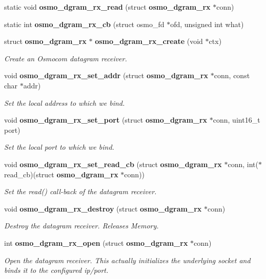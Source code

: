 \begin{DoxyCompactItemize}
static void {\bfseries osmo\+\_\+dgram\+\_\+rx\+\_\+read} (struct {\bf osmo\+\_\+dgram\+\_\+rx} $\ast$conn)
\item 
static int {\bfseries osmo\+\_\+dgram\+\_\+rx\+\_\+cb} (struct osmo\+\_\+fd $\ast$ofd, unsigned int what)
\item 
struct {\bf osmo\+\_\+dgram\+\_\+rx} $\ast$ {\bf osmo\+\_\+dgram\+\_\+rx\+\_\+create} (void $\ast$ctx)
\begin{DoxyCompactList}\small\item\em Create an Osmocom datagram receiver. \end{DoxyCompactList}\item 
void {\bf osmo\+\_\+dgram\+\_\+rx\+\_\+set\+\_\+addr} (struct {\bf osmo\+\_\+dgram\+\_\+rx} $\ast$conn, const char $\ast$addr)
\begin{DoxyCompactList}\small\item\em Set the local address to which we bind. \end{DoxyCompactList}\item 
void {\bf osmo\+\_\+dgram\+\_\+rx\+\_\+set\+\_\+port} (struct {\bf osmo\+\_\+dgram\+\_\+rx} $\ast$conn, uint16\+\_\+t port)
\begin{DoxyCompactList}\small\item\em Set the local port to which we bind. \end{DoxyCompactList}\item 
void {\bf osmo\+\_\+dgram\+\_\+rx\+\_\+set\+\_\+read\+\_\+cb} (struct {\bf osmo\+\_\+dgram\+\_\+rx} $\ast$conn, int($\ast$read\+\_\+cb)(struct {\bf osmo\+\_\+dgram\+\_\+rx} $\ast$conn))
\begin{DoxyCompactList}\small\item\em Set the read() call-\/back of the datagram receiver. \end{DoxyCompactList}\item 
void {\bf osmo\+\_\+dgram\+\_\+rx\+\_\+destroy} (struct {\bf osmo\+\_\+dgram\+\_\+rx} $\ast$conn)
\begin{DoxyCompactList}\small\item\em Destroy the datagram receiver. Releases Memory. \end{DoxyCompactList}\item 
int {\bf osmo\+\_\+dgram\+\_\+rx\+\_\+open} (struct {\bf osmo\+\_\+dgram\+\_\+rx} $\ast$conn)
\begin{DoxyCompactList}\small\item\em Open the datagram receiver. This actually initializes the underlying socket and binds it to the configured ip/port. \end{DoxyCompactList}\item 

\end{DoxyCompactItemize}
